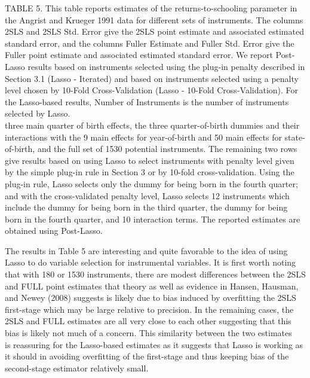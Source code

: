 \documentclass[10pt]{article}
\begin{document}
TABLE 5. This table reports estimates of the returns-to-schooling parameter in the Angrist and Krueger 1991 data for different sets of instruments. The columns 2SLS and 2SLS Std. Error give the 2SLS point estimate and associated estimated standard error, and the columns Fuller Estimate and Fuller Std. Error give the Fuller point estimate and associated estimated standard error. We report Post-Lasso results based on instruments selected using the plug-in penalty described in Section 3.1 (Lasso - Iterated) and based on instruments selected using a penalty level chosen by 10-Fold Cross-Validation (Lasso - 10-Fold Cross-Validation). For the Lasso-based results, Number of Instruments is the number of instruments selected by Lasso.\\
three main quarter of birth effects, the three quarter-of-birth dummies and their interactions with the 9 main effects for year-of-birth and 50 main effects for state-of-birth, and the full set of 1530 potential instruments. The remaining two rows give results based on using Lasso to select instruments with penalty level given by the simple plug-in rule in Section 3 or by 10-fold cross-validation. Using the plug-in rule, Lasso selects only the dummy for being born in the fourth quarter; and with the cross-validated penalty level, Lasso selects 12 instruments which include the dummy for being born in the third quarter, the dummy for being born in the fourth quarter, and 10 interaction terms. The reported estimates are obtained using Post-Lasso.

The results in Table 5 are interesting and quite favorable to the idea of using Lasso to do variable selection for instrumental variables. It is first worth noting that with 180 or 1530 instruments, there are modest differences between the 2SLS and FULL point estimates that theory as well as evidence in Hansen, Hausman, and Newey (2008) suggests is likely due to bias induced by overfitting the 2SLS first-stage which may be large relative to precision. In the remaining cases, the 2SLS and FULL estimates are all very close to each other suggesting that this bias is likely not much of a concern. This similarity between the two estimates\\
is reassuring for the Lasso-based estimates as it suggests that Lasso is working as it should in avoiding overfitting of the first-stage and thus keeping bias of the second-stage estimator relatively small.
\end{document}
